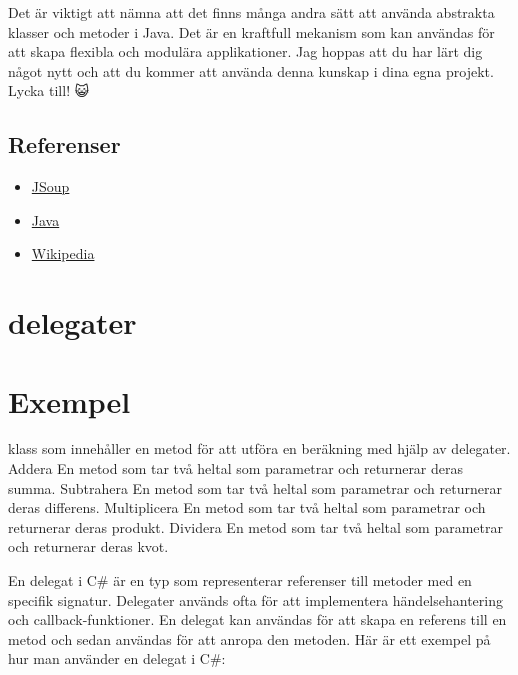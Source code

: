 Det är viktigt att nämna att det finns många andra sätt att använda
abstrakta klasser och metoder i Java. Det är en kraftfull mekanism som
kan användas för att skapa flexibla och modulära applikationer. Jag
hoppas att du har lärt dig något nytt och att du kommer att använda
denna kunskap i dina egna projekt. Lycka till! 😺

\hypertarget{referenser}{%
\subsection{Referenser}\label{referenser}}

\begin{itemize}
\tightlist
\item
  \href{https://jsoup.org/}{JSoup}
\item
  \href{https://www.java.com/}{Java}
\item
  \href{https://en.wikipedia.org/wiki/Abstract_type}{Wikipedia}
\end{itemize}

\hypertarget{delegater}{%
\section{delegater}\label{delegater}}

\hypertarget{exempel}{%
\section{Exempel}\label{exempel}}

klass som innehåller en metod för att utföra en beräkning med hjälp av
delegater. \textbar{} \textbar{} Addera \textbar{} En metod som tar två
heltal som parametrar och returnerar deras summa. \textbar{} \textbar{}
Subtrahera \textbar{} En metod som tar två heltal som parametrar och
returnerar deras differens. \textbar{} \textbar{} Multiplicera\textbar{}
En metod som tar två heltal som parametrar och returnerar deras produkt.
\textbar{} \textbar{} Dividera \textbar{} En metod som tar två heltal
som parametrar och returnerar deras kvot. \textbar{}

En delegat i C\# är en typ som representerar referenser till metoder med
en specifik signatur. Delegater används ofta för att implementera
händelsehantering och callback-funktioner. En delegat kan användas för
att skapa en referens till en metod och sedan användas för att anropa
den metoden. Här är ett exempel på hur man använder en delegat i C\#:

